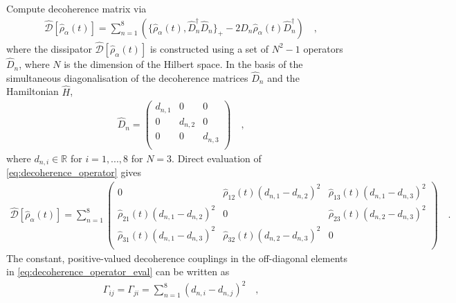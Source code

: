 Compute decoherence matrix via  \cite{Coelho:2017byq}
%
    \begin{align} \label{eq:decoherence_operator}
        \hat{\mathcal{D}}[\hat{\rho}_\alpha(t)] 
        =
        \sum_{n=1}^8\left( \{ \hat{\rho}_\alpha(t) , \hat{D}_n^\dagger \hat{D}_n \}_+ - 2 \hat{D}_n \hat{\rho}_\alpha(t) \hat{D}_n^\dagger \right)
        \quad \text{,}
    \end{align}
%
where the dissipator $\hat{\mathcal{D}}[\hat{\rho}_\alpha(t)]$ is constructed using a set of $N^2 -1$ operators $\hat{D}_n$, where $N$ is the dimension of the Hilbert space. In the basis of the simultaneous diagonalisation of the decoherence matrices $\hat{D}_n$ and the Hamiltonian $\hat{H}$, 
%
    \begin{align} \label{eq:diagonal_d_matrices}
        \hat{D}_n 
        =
    \begin{pmatrix}
        d_{n,1} & 0 & 0 \\
        0 & d_{n,2} & 0 \\
        0 & 0 & d_{n,3} \\
    \end{pmatrix}
        \quad \text{,}
    \end{align}
%
where $d_{n,i}\in\mathbb{R}$ for $i=1,...,8$ for $N=3$. Direct evaluation of \cref{eq:decoherence_operator} gives
%
    \begin{align} \label{eq:decoherence_operator_eval}
        \hat{\mathcal{D}}[\hat{\rho}_\alpha(t)] 
        =
        \sum_{n=1}^8
        \begin{pmatrix}
            0 & \hat{\rho}_{12}(t)\left(d_{n,1} - d_{n,2}\right)^2 & \hat{\rho}_{13}(t)\left(d_{n,1} - d_{n,3}\right)^2 \\
            \hat{\rho}_{21}(t)\left(d_{n,1} - d_{n,2}\right)^2 & 0 & \hat{\rho}_{23}(t)\left(d_{n,2} - d_{n,3}\right)^2 \\
            \hat{\rho}_{31}(t)\left(d_{n,1} - d_{n,3}\right)^2 & \hat{\rho}_{32}(t)\left(d_{n,2} - d_{n,3}\right)^2 & 0 \\
        \end{pmatrix}
        \quad \text{.}
    \end{align}
%
The constant, positive-valued decoherence couplings in the off-diagonal elements in \cref{eq:decoherence_operator_eval} can be written as \cite{Coelho:2017byq}
%
    \begin{align} \label{eq:decoherence_couplings}
        \Gamma_{ij} = \Gamma_{ji} 
        =
        \sum_{n=1}^8 \left(d_{n,i} - d_{n,j}\right)^2
        \quad \text{,}
    \end{align}
